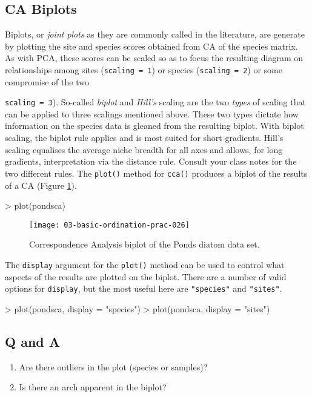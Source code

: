 \documentclass[a4paper,10pt]{article}
\newcommand{\cca}{\texttt{cca()}\xspace}
\begin{document}
\subsection{CA Biplots}
Biplots, or \emph{joint plots} as they are commonly called in the literature, are generate by plotting the site and species scores obtained from CA of the species matrix. As with PCA, these scores can be scaled so as to focus the resulting diagram on relationships among sites (\texttt{scaling = 1}) or species (\texttt{scaling = 2}) or some compromise of the two {\texttt{scaling = 3}). So-called \emph{biplot} and \emph{Hill's} scaling are the two \emph{types} of scaling that can be applied to three scalings mentioned above. These two types dictate how information on the species data is gleaned from the resulting biplot. With biplot scaling, the biplot rule applies and is most suited for short gradients. Hill's scaling equalises the average niche breadth for all axes and allows, for long gradients, interpretation via the distance rule. Consult your class notes for the two different rules. The \texttt{plot()} method for \cca produces a biplot of the results of a CA (Figure \ref{ca_biplot}).
\begin{Schunk}
\begin{Sinput}
> plot(pondsca)
\end{Sinput}
\end{Schunk}
\begin{figure}[t]
\begin{center}
\texttt{[image: 03-basic-ordination-prac-026]}
\caption{\label{ca_biplot}Correspondence Analysis biplot of the Ponds diatom data set.}
\end{center}
\end{figure}
The \texttt{display} argument for the \texttt{plot()} method can be used to control what aspects of the results are plotted on the biplot. There are a number of valid options for \texttt{display}, but the most useful here are \texttt{"species"} and \texttt{"sites"}.
\begin{Schunk}
\begin{Sinput}
> plot(pondsca, display = "species")
> plot(pondsca, display = "sites")
\end{Sinput}
\end{Schunk}
\subsection*{Q and A}
\begin{enumerate}
\item Are there outliers in the plot (species or samples)?
\item Is there an arch apparent in the biplot?
\end{enumerate}

}
\end{document}

